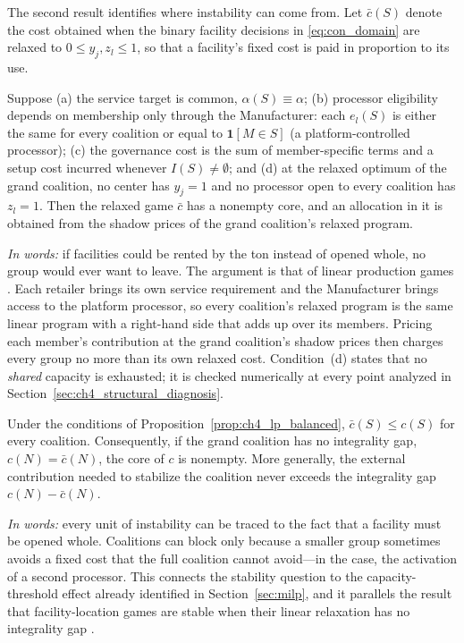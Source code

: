 The second result identifies where instability can come from. Let $\bar c(S)$ denote the cost obtained when the binary facility decisions in \eqref{eq:con_domain} are relaxed to $0\leq y_j,z_l\leq 1$, so that a facility's fixed cost is paid in proportion to its use.

\begin{proposition}
\label{prop:ch4_lp_balanced}
Suppose (a) the service target is common, $\alpha(S)\equiv\alpha$; (b) processor eligibility depends on membership only through the Manufacturer: each $e_l(S)$ is either the same for every coalition or equal to $\mathbf{1}[M\in S]$ (a platform-controlled processor); (c) the governance cost is the sum of member-specific terms and a setup cost incurred whenever $I(S)\neq\emptyset$; and (d) at the relaxed optimum of the grand coalition, no center has $y_j=1$ and no processor open to every coalition has $z_l=1$. Then the relaxed game $\bar c$ has a nonempty core, and an allocation in it is obtained from the shadow prices of the grand coalition's relaxed program.
\end{proposition}

\emph{In words:} if facilities could be rented by the ton instead of opened whole, no group would ever want to leave. The argument is that of linear production games \cite{Owen1975}. Each retailer brings its own service requirement and the Manufacturer brings access to the platform processor, so every coalition's relaxed program is the same linear program with a right-hand side that adds up over its members. Pricing each member's contribution at the grand coalition's shadow prices then charges every group no more than its own relaxed cost. Condition~(d) states that no \emph{shared} capacity is exhausted; it is checked numerically at every point analyzed in Section~\ref{sec:ch4_structural_diagnosis}.

\begin{proposition}
\label{prop:ch4_indivisibility}
Under the conditions of Proposition~\ref{prop:ch4_lp_balanced}, $\bar c(S)\leq c(S)$ for every coalition. Consequently, if the grand coalition has no integrality gap, $c(N)=\bar c(N)$, the core of $c$ is nonempty. More generally, the external contribution needed to stabilize the coalition never exceeds the integrality gap $c(N)-\bar c(N)$.
\end{proposition}

\emph{In words:} every unit of instability can be traced to the fact that a facility must be opened whole. Coalitions can block only because a smaller group sometimes avoids a fixed cost that the full coalition cannot avoid---in the case, the activation of a second processor. This connects the stability question to the capacity-threshold effect already identified in Section~\ref{sec:milp}, and it parallels the result that facility-location games are stable when their linear relaxation has no integrality gap \cite{GoemansSkutella2004}.

